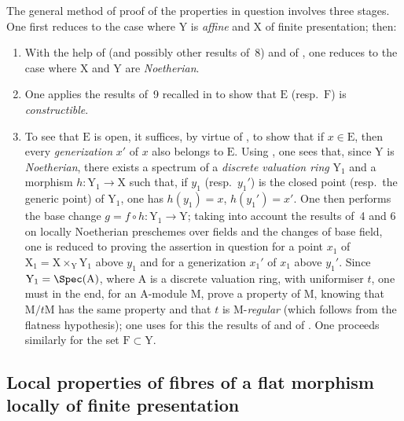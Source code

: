 \begin{env}[12.0.2]
\label{IV.12.0.2}
The general method of proof of the properties in question involves three stages.
One first reduces to the case where $\mathrm{Y}$ is \emph{affine} and $\mathrm{X}$ of finite presentation; then:

\medskip
\begin{enumerate}[label=\emph{\Alph*)}]
  \item With the help of  (and possibly other results of \textsection\,8) and of , one reduces to the case where $\mathrm{X}$ and $\mathrm{Y}$ are \emph{Noetherian}.

  \item One applies the results of \textsection\,9 recalled in  to show that $\mathrm{E}$ (resp.\ $\mathrm{F}$) is \emph{constructible}.

  \item To see that $\mathrm{E}$ is open, it suffices, by virtue of , to show that if $x\in\mathrm{E}$, then every \emph{generization} $x'$ of $x$ also belongs to $\mathrm{E}$.
Using , one sees that, since $\mathrm{Y}$ is \emph{Noetherian}, there exists a spectrum of a \emph{discrete valuation ring} $\mathrm{Y}_1$ and a morphism $h:\mathrm{Y}_1\to\mathrm{X}$ such that, if $y_1$ (resp.\ $y_1'$) is the closed point (resp.\ the generic point) of $\mathrm{Y}_1$, one has $h(y_1)=x$, $h(y_1')=x'$.
One then performs the base change $g=f\circ h:\mathrm{Y}_1\to\mathrm{Y}$; taking into account the results of \textsection\textsection\,4 and 6 on locally Noetherian preschemes over fields and the changes of base field, one is reduced to proving the assertion in question for a point $x_1$ of $\mathrm{X}_1=\mathrm{X}\times_{\mathrm{Y}}\mathrm{Y}_1$ above $y_1$ and for a generization $x_1'$ of $x_1$ above $y_1'$.
Since $\mathrm{Y}_1=\Spec(\mathrm{A})$, where $\mathrm{A}$ is a discrete valuation ring, with uniformiser $t$, one must in the end, for an $\mathrm{A}$-module $\mathrm{M}$, prove a property of $\mathrm{M}$, knowing that $\mathrm{M}/t\mathrm{M}$ has the same property and that $t$ is $\mathrm{M}$-\emph{regular} (which follows from the flatness hypothesis); one uses for this the results of  and of .
One proceeds similarly for the set $\mathrm{F}\subset\mathrm{Y}$.
\end{enumerate}
\end{env}

\subsection{Local properties of fibres of a flat morphism locally of finite presentation}
\label{subsection:IV.12.1}

